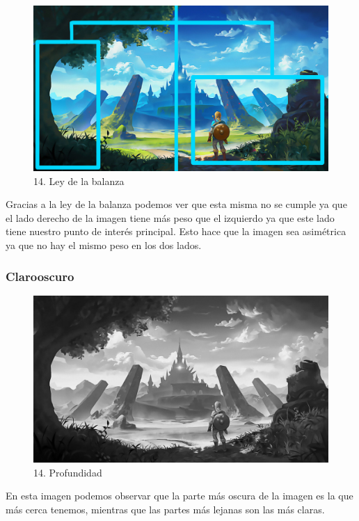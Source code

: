 \documentclass[12pt]{article}
\begin{document}
    \begin{figure}[H]
      \centering
      \includegraphics[width=\textwidth]{images/Selena/14 balanza.jpg}
      \caption{\small 14. Ley de la balanza}
    \end{figure}
    Gracias a la ley de la balanza podemos ver que esta misma no se cumple ya que el lado derecho de la imagen tiene más peso que el izquierdo ya que este lado tiene nuestro punto de interés principal. Esto hace que la imagen sea asimétrica ya que no hay el mismo peso en los dos lados. 

    \subsubsection{Clarooscuro}
    \begin{figure}[H]
      \centering
      \includegraphics[width=\textwidth]{images/Selena/14_concept_art gris.jpg}
      \caption{\small 14. Profundidad}
    \end{figure}
    En esta imagen podemos observar que la parte más oscura de la imagen es la que más cerca tenemos, mientras que las partes más lejanas son las más claras.
\end{document}
